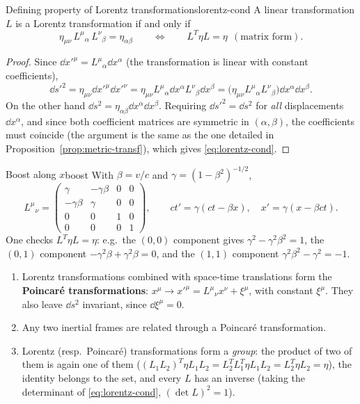 \begin{proposition}{Defining property of Lorentz transformations}{lorentz-cond}
A linear transformation $L$ is a Lorentz transformation if and only if
\begin{equation}
  \eta_{\mu\nu}\,L^\mu{}_\alpha\,L^\nu{}_\beta=\eta_{\alpha\beta}
  \qquad\Longleftrightarrow\qquad L^{T}\eta L=\eta \ \ (\text{matrix form}).
  \label{eq:lorentz-cond}
\end{equation}
\end{proposition}
\begin{proof}
Since $\dd x'^\mu=L^\mu{}_\alpha\dd x^\alpha$ (the transformation is linear with constant coefficients),
\[
  \dd s'^2=\eta_{\mu\nu}\dd x'^\mu\dd x'^\nu=\eta_{\mu\nu}L^\mu{}_\alpha\dd x^\alpha L^\nu{}_\beta\dd x^\beta
  =\big(\eta_{\mu\nu}L^\mu{}_\alpha L^\nu{}_\beta\big)\dd x^\alpha\dd x^\beta .
\]
On the other hand $\dd s^2=\eta_{\alpha\beta}\dd x^\alpha\dd x^\beta$. Requiring $\dd s'^2=\dd s^2$ for \emph{all} displacements $\dd x^\alpha$, and since both coefficient matrices are symmetric in $(\alpha,\beta)$, the coefficients must coincide (the argument is the same as the one detailed in Proposition~\ref{prop:metric-transf}), which gives \eqref{eq:lorentz-cond}.
\end{proof}

\begin{example}{Boost along $x$}{boost}
With $\beta=v/c$ and $\gamma=(1-\beta^2)^{-1/2}$,
\[
L^\mu{}_\nu=\begin{pmatrix}\gamma&-\gamma\beta&0&0\\-\gamma\beta&\gamma&0&0\\0&0&1&0\\0&0&0&1\end{pmatrix},
\qquad ct'=\gamma(ct-\beta x),\quad x'=\gamma(x-\beta ct).
\]
One checks $L^T\eta L=\eta$: e.g.\ the $(0,0)$ component gives $\gamma^2-\gamma^2\beta^2=1$, the $(0,1)$ component $-\gamma^2\beta+\gamma^2\beta=0$, and the $(1,1)$ component $\gamma^2\beta^2-\gamma^2=-1$.
\end{example}

\begin{remarkbox}[Remarks]
\begin{enumerate}[nosep]
  \item Lorentz transformations combined with space-time translations form the \textbf{Poincaré transformations}:
  $x^\mu\to x'^\mu=L^\mu{}_\nu x^\nu+\xi^\mu$, with constant $\xi^\mu$. They also leave $\dd s^2$ invariant, since $\dd\xi^\mu=0$.
  \item Any two inertial frames are related through a Poincaré transformation.
  \item Lorentz (resp.\ Poincaré) transformations form a \emph{group}: the product of two of them is again one of them ($(L_1L_2)^T\eta L_1L_2=L_2^TL_1^T\eta L_1L_2=L_2^T\eta L_2=\eta$), the identity belongs to the set, and every $L$ has an inverse (taking the determinant of \eqref{eq:lorentz-cond}, $(\det L)^2=1$).
\end{enumerate}
\end{remarkbox}

